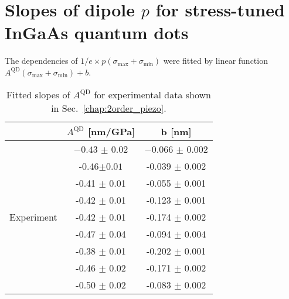 \chapter{Slopes of dipole $p$ for stress-tuned InGaAs quantum dots}
\label{app:slopes_of_dipole}
	

	
	The dependencies of $1/e\times p \left( \sigma_\mathrm{max}+\sigma_\mathrm{min} \right)$ were fitted by linear function $ A^{\mathrm{QD}}\left(\sigma_\mathrm{max} + \sigma_\mathrm{min}\right) + b$. %
	
	\begin{table}[ht!]
		\centering
		\caption{Fitted slopes of $A^{\mathrm{QD}}$ for experimental data shown in Sec.~\ref{chap:2order_piezo}.}
		\label{tab:exp_slopes}
		\begin{tabular}{|c|c|c|}
			\hline
			& $A^{\mathrm{QD}}$  [nm/GPa]    & b   [nm]    \\ \hline
			\multirow{9}{*}{Experiment} & $-0.43$ $\pm$ $0.02$  & $-0.066$ $\pm$ $0.002$      \\ \cline{2-3}
			& -0.46$ \pm 0.01$  & -0.039 $\pm$ 0.002      \\ \cline{2-3}
			& -0.41 $\pm$ 0.01  & -0.055 $\pm$ 0.001      \\ \cline{2-3}
			& -0.42 $\pm$ 0.01  & -0.123 $\pm$ 0.001      \\ \cline{2-3}
			& -0.42 $\pm$ 0.01  & -0.174 $\pm$ 0.002      \\ \cline{2-3}
			& -0.47 $\pm$ 0.04  & -0.094 $\pm$ 0.004      \\ \cline{2-3}
			& -0.38 $\pm$ 0.01  & -0.202 $\pm$ 0.001      \\ \cline{2-3}
			& -0.46 $\pm$ 0.02  & -0.171 $\pm$ 0.002      \\ \cline{2-3}
			& -0.50 $\pm$ 0.02  & -0.083 $\pm$ 0.002      \\ \hline
		\end{tabular}    
	\end{table} 
	
